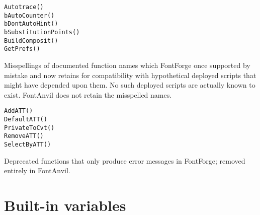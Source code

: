 \noindent
\texttt{Autotrace()}\FFdiff\\
\texttt{bAutoCounter()}\\
\texttt{bDontAutoHint()}\\
\texttt{bSubstitutionPoints()}\\
\texttt{BuildComposit()}\\
\texttt{GetPrefs()}

Misspellings of documented function names which FontForge once supported by
mistake and now retains for compatibility with hypothetical deployed
scripts that might have depended upon them.  No such deployed scripts are
actually known to exist.  FontAnvil does not retain the misspelled names.

\noindent
\texttt{AddATT()}\FFdiff\\
\texttt{DefaultATT()}\\
\texttt{PrivateToCvt()}\\
\texttt{RemoveATT()}\\
\texttt{SelectByATT()}

Deprecated functions that only produce error messages in FontForge; removed
entirely in FontAnvil.


\section{Built-in variables}

